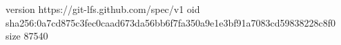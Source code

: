 version https://git-lfs.github.com/spec/v1
oid sha256:0a7cd875c3fec0caad673da56bb6f7fa350a9e1e3bf91a7083cd59838228c8f0
size 87540
